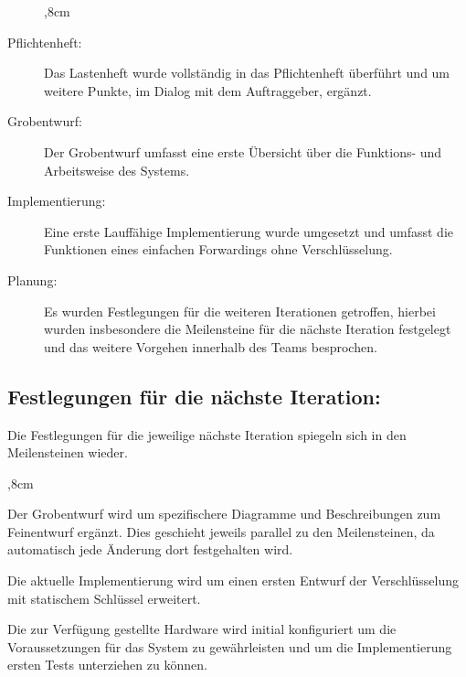 \begin{description}
	,8cm
		\item[Pflichtenheft:] Das Lastenheft wurde vollständig in das Pflichtenheft überführt und um weitere Punkte, im Dialog mit dem Auftraggeber, ergänzt.
		
		\item[Grobentwurf:] Der Grobentwurf umfasst eine erste Übersicht über die Funktions- und Arbeitsweise des Systems.
		
		\item[Implementierung:] Eine erste Lauffähige Implementierung wurde umgesetzt und umfasst die Funktionen eines einfachen Forwardings ohne Verschlüsselung.
		
		\item[Planung:] Es wurden Festlegungen für die weiteren Iterationen getroffen, hierbei wurden insbesondere die Meilensteine für die nächste Iteration festgelegt und das weitere Vorgehen innerhalb des Teams besprochen.
		
	\end{description}

\subsection{Festlegungen für die nächste Iteration:}
Die Festlegungen für die jeweilige nächste Iteration spiegeln sich in den Meilensteinen wieder.

\begin{description}
	,8cm
		\item[Grobentwurf verfeinern:] Der Grobentwurf wird um spezifischere Diagramme und Beschreibungen zum Feinentwurf ergänzt. Dies geschieht jeweils parallel zu den Meilensteinen, da automatisch jede Änderung dort festgehalten wird.
		
		\item[Implementierung erweitern:] Die aktuelle Implementierung wird um einen ersten Entwurf der Verschlüsselung mit statischem Schlüssel erweitert.
		
		\item[Hardware konfigurieren:] Die zur Verfügung gestellte Hardware wird initial konfiguriert um die Voraussetzungen für das System zu gewährleisten und um die Implementierung ersten Tests unterziehen zu können.
		
	\end{description}
  

